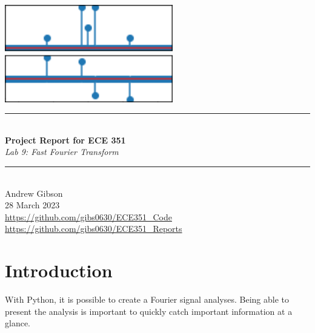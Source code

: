 \documentclass[12pt,a4paper]{article}
\newcommand{\HRule}{\rule{\linewidth}{0.5mm}}
\begin{document}
\begin{titlepage}
\begin{center}
\includegraphics[width=0.55\textwidth]{titlepage_image.png}~\\[2cm]
\HRule \\[0.4cm]
{ \LARGE 
  \textbf{Project Report for ECE 351}\\[0.4cm]
  \emph{Lab 9: Fast Fourier Transform}\\[0.4cm]
}
\HRule \\[1.5cm]
{ \large
  Andrew Gibson \\[0.1cm]
 28 March 2023\\[0.1cm]
  \url{https://github.com/gibs0630/ECE351\_Code}\\[0.1cm]
  \url{https://github.com/gibs0630/ECE351\_Reports}\\[0.1cm]
}
\vfill
{\large }
 
\end{center}
\end{titlepage}
\newpage
\tableofcontents
{}
\newpage
\setcounter{page}{1}
\section{Introduction}\label{sec:intro}
With Python, it is possible to create a Fourier signal analyses.  Being able to present the analysis is important to quickly catch important information at a glance.
\end{document}
